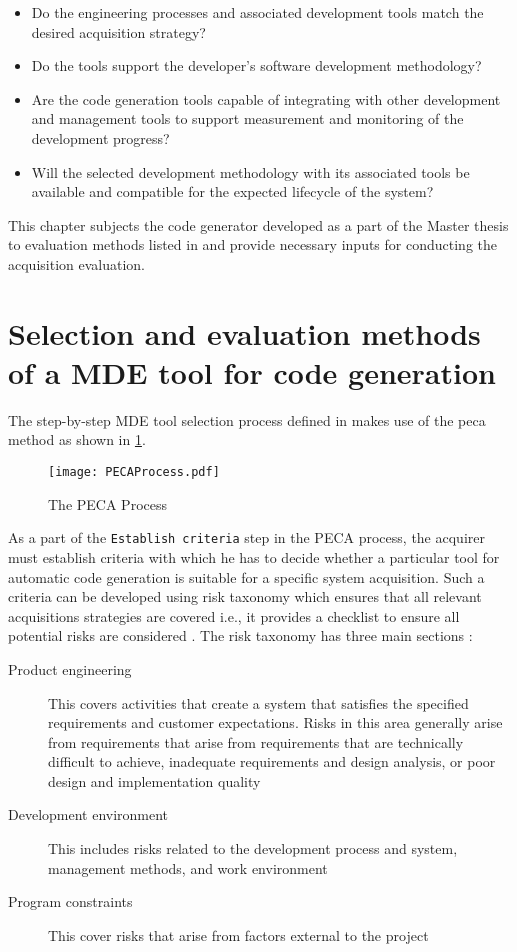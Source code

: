 \begin{itemize}
\item Do the engineering processes and associated development tools match the desired acquisition strategy?
\item Do the tools support the developer's software development methodology?
\item Are the code generation tools capable of integrating with other development and management tools to support measurement and monitoring of the development progress?
\item Will the selected development methodology with its associated tools be available and compatible for the expected lifecycle of the system? 
\end{itemize}

This chapter subjects the code generator developed as a part of the Master thesis to evaluation methods listed in \cite{EvalCodeGen} and provide necessary inputs for conducting the acquisition evaluation.

\section{Selection and evaluation methods of a MDE tool for code generation}
The step-by-step MDE tool selection process defined in \cite{EvalCodeGen} makes use of the \ac{peca} method \cite{PECAProcess} as shown in \cref{fig: PECA method}.  

\begin{figure}[h]
	\centering
	\texttt{[image: PECAProcess.pdf]}
	\caption{The PECA Process}
	\label{fig: PECA method}
\end{figure}

As a part of the \texttt{Establish criteria} step in the PECA process, the acquirer must establish criteria with which he has to decide whether a particular tool for automatic code generation is suitable for a specific system acquisition. Such a criteria can be developed using risk taxonomy \cite{RiskTax} which ensures that all relevant acquisitions strategies are covered i.e., it provides a checklist to ensure all potential risks are considered \cite{EvalCodeGen}. The risk taxonomy has three main sections \cite{RiskTax}:

\begin{description}
\item [Product engineering] This covers activities that create a system that satisfies the specified requirements and customer expectations. Risks in this area generally arise from requirements that arise from requirements that are technically difficult to achieve, inadequate requirements and design analysis, or poor design and implementation quality 
\item [Development environment] This includes risks related to the development process and system, management methods, and work environment
\item [Program constraints] This cover risks that arise from factors external to the project 
\end{description}

